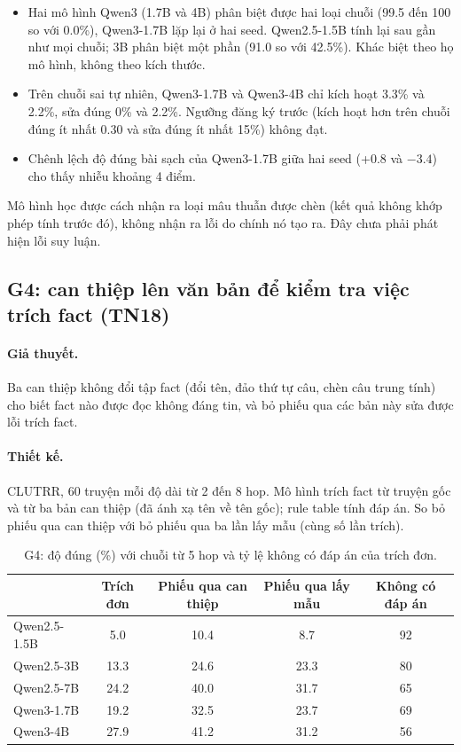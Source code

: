 \documentclass[11pt]{article}
\begin{document}
\begin{cachdoc}
\begin{itemize}[leftmargin=*,itemsep=1pt]
\item Hai mô hình Qwen3 (1.7B và 4B) phân biệt được hai loại chuỗi (99.5 đến 100 so với 0.0\%), Qwen3-1.7B lặp lại
  ở hai seed. Qwen2.5-1.5B tính lại sau gần như mọi chuỗi; 3B phân biệt một phần (91.0 so với 42.5\%). Khác biệt
  theo họ mô hình, không theo kích thước.
\item Trên chuỗi sai tự nhiên, Qwen3-1.7B và Qwen3-4B chỉ kích hoạt 3.3\% và 2.2\%, sửa đúng 0\% và 2.2\%. Ngưỡng đăng ký trước (kích hoạt
  hơn trên chuỗi đúng ít nhất 0.30 và sửa đúng ít nhất 15\%) không đạt.
\item Chênh lệch độ đúng bài sạch của Qwen3-1.7B giữa hai seed (+0.8 và $-3.4$) cho thấy nhiễu khoảng 4 điểm.
\end{itemize}
\end{cachdoc}

\begin{ketluan}
Mô hình học được cách nhận ra loại mâu thuẫn được chèn (kết quả không khớp phép tính trước đó), không nhận ra
lỗi do chính nó tạo ra. Đây chưa phải phát hiện lỗi suy luận.
\end{ketluan}

\subsection{G4: can thiệp lên văn bản để kiểm tra việc trích fact (TN18)}

\paragraph{Giả thuyết.} Ba can thiệp không đổi tập fact (đổi tên, đảo thứ tự câu, chèn câu trung tính) cho biết
fact nào được đọc không đáng tin, và bỏ phiếu qua các bản này sửa được lỗi trích fact.

\paragraph{Thiết kế.} CLUTRR, 60 truyện mỗi độ dài từ 2 đến 8 hop. Mô hình trích fact từ truyện gốc và từ ba
bản can thiệp (đã ánh xạ tên về tên gốc); rule table tính đáp án. So bỏ phiếu qua can thiệp với bỏ phiếu qua
ba lần lấy mẫu (cùng số lần trích).

\begin{table}[h]
\centering\small
\caption{G4: độ đúng (\%) với chuỗi từ 5 hop và tỷ lệ không có đáp án của trích đơn.}
\begin{tabular}{lcccc}
\toprule
 & Trích đơn & Phiếu qua can thiệp & Phiếu qua lấy mẫu & Không có đáp án \\
\midrule
Qwen2.5-1.5B & 5.0 & 10.4 & 8.7 & 92 \\
Qwen2.5-3B & 13.3 & 24.6 & 23.3 & 80 \\
Qwen2.5-7B & 24.2 & 40.0 & 31.7 & 65 \\
Qwen3-1.7B & 19.2 & 32.5 & 23.7 & 69 \\
Qwen3-4B & 27.9 & 41.2 & 31.2 & 56 \\
\bottomrule
\end{tabular}
\end{table}
\end{document}

